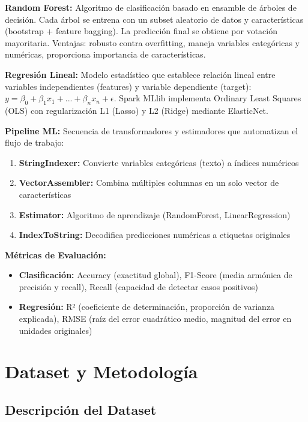 \documentclass[12pt,a4paper]{article}
\begin{document}
\textbf{Random Forest:} Algoritmo de clasificación basado en ensamble de árboles de decisión. Cada árbol se entrena con un subset aleatorio de datos y características (bootstrap + feature bagging). La predicción final se obtiene por votación mayoritaria. Ventajas: robusto contra overfitting, maneja variables categóricas y numéricas, proporciona importancia de características.

\textbf{Regresión Lineal:} Modelo estadístico que establece relación lineal entre variables independientes (features) y variable dependiente (target): $y = \beta_0 + \beta_1 x_1 + ... + \beta_n x_n + \epsilon$. Spark MLlib implementa Ordinary Least Squares (OLS) con regularización L1 (Lasso) y L2 (Ridge) mediante ElasticNet.

\textbf{Pipeline ML:} Secuencia de transformadores y estimadores que automatizan el flujo de trabajo:
\begin{enumerate}
    \item \textbf{StringIndexer:} Convierte variables categóricas (texto) a índices numéricos
    \item \textbf{VectorAssembler:} Combina múltiples columnas en un solo vector de características
    \item \textbf{Estimator:} Algoritmo de aprendizaje (RandomForest, LinearRegression)
    \item \textbf{IndexToString:} Decodifica predicciones numéricas a etiquetas originales
\end{enumerate}

\textbf{Métricas de Evaluación:}

\begin{itemize}
    \item \textbf{Clasificación:} Accuracy (exactitud global), F1-Score (media armónica de precisión y recall), Recall (capacidad de detectar casos positivos)
    \item \textbf{Regresión:} R² (coeficiente de determinación, proporción de varianza explicada), RMSE (raíz del error cuadrático medio, magnitud del error en unidades originales)
\end{itemize}

\section{Dataset y Metodología}

\subsection{Descripción del Dataset}
\end{document}
